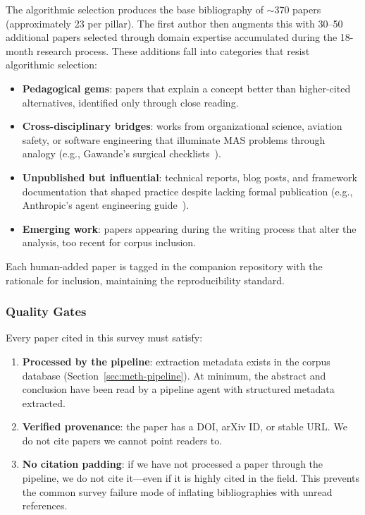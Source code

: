 \documentclass{article}
\begin{document}
The algorithmic selection produces the base bibliography of $\sim$370 papers
(approximately 23 per pillar).
The first author then augments this with 30--50 additional papers selected
through domain expertise accumulated during the 18-month research process.
These additions fall into categories that resist algorithmic selection:

\begin{itemize}[itemsep=2pt]
  \item \textbf{Pedagogical gems}: papers that explain a concept better than
    higher-cited alternatives, identified only through close reading.
  \item \textbf{Cross-disciplinary bridges}: works from organizational science,
    aviation safety, or software engineering that illuminate MAS problems
    through analogy (e.g., Gawande's surgical
    checklists~\citep{gawande2009checklist}).
  \item \textbf{Unpublished but influential}: technical reports, blog posts,
    and framework documentation that shaped practice despite lacking formal
    publication (e.g., Anthropic's agent engineering
    guide~\citep{anthropic2025building}).
  \item \textbf{Emerging work}: papers appearing during the writing process
    that alter the analysis, too recent for corpus inclusion.
\end{itemize}

\noindent
Each human-added paper is tagged in the companion repository with the rationale
for inclusion, maintaining the reproducibility standard.

\subsubsection{Quality Gates}

Every paper cited in this survey must satisfy:

\begin{enumerate}[itemsep=2pt]
  \item \textbf{Processed by the pipeline}: extraction metadata exists in the
    corpus database (Section~\ref{sec:meth-pipeline}). At minimum, the abstract
    and conclusion have been read by a pipeline agent with structured metadata
    extracted.
  \item \textbf{Verified provenance}: the paper has a DOI, arXiv ID, or
    stable URL. We do not cite papers we cannot point readers to.
  \item \textbf{No citation padding}: if we have not processed a paper
    through the pipeline, we do not cite it---even if it is highly cited
    in the field. This prevents the common survey failure mode of
    inflating bibliographies with unread references.
\end{enumerate}
\end{document}
